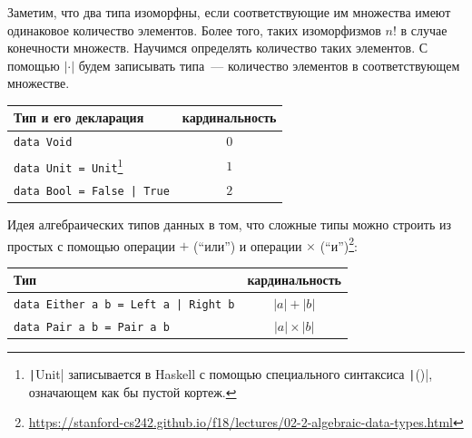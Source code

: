 Заметим, что два типа изоморфны, если соответствующие им множества имеют одинаковое количество элементов.
Более того, таких изоморфизмов $n!$ в случае конечности множеств.
Научимся определять количество таких элементов.
С помощью $|\cdot|$ будем записывать  типа~--- количество элементов в соответствующем множестве.

\begin{center}
    \begin{tabular}{|l|c|}
        \hline
        Тип и его декларация                                                                                                                                                                            & кардинальность \\
        \hline
        \texttt{data Void}                                                                                                                                                                 & $0$            \\
        \texttt{data Unit = Unit}\footnote{\texttt|Unit| записывается в Haskell с помощью специального синтаксиса \texttt|()|, означающем как бы пустой кортеж.} & $1$ \\
        \texttt{data Bool = False | True}                                                                                                                                                  & $2$            \\
        \hline
    \end{tabular}
\end{center}

Идея алгебраических типов данных в том, что сложные типы можно строить из простых с помощью операции $+$ (``или'') и операции $\times$ (``и'')\footnote{\url{https://stanford-cs242.github.io/f18/lectures/02-2-algebraic-data-types.html}}:
\begin{center}
    \begin{tabular}{|l|c|}
        \hline
        Тип                                                      & кардинальность   \\
        \hline
        \texttt{data Either a b = Left a | Right b} & $|a| + |b|$      \\
        \texttt{data Pair a b = Pair a b}           & $|a| \times |b|$ \\
        \hline
    \end{tabular}
\end{center}

